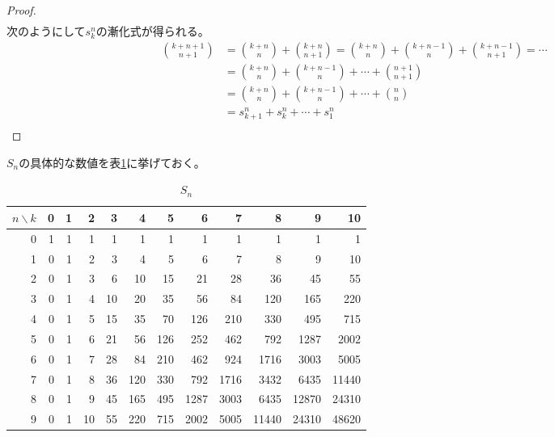 {\begin{proof}
\begin{equation*}
\begin{split}
		\end{split}\end{equation*}
		次のようにして$s^n_k$の漸化式が得られる。
		\begin{equation*}\begin{split}
			\binom{k+n+1}{n+1} &= \binom{k+n}{n} + \binom{k+n}{n+1}
			= \binom{k+n}{n} + \binom{k+n-1}{n} + \binom{k+n-1}{n+1} = \cdots \\
			&= \binom{k+n}{n} + \binom{k+n-1}{n} +\cdots+ \binom{n+1}{n+1} \\
			&= \binom{k+n}{n} + \binom{k+n-1}{n} +\cdots+ \binom{n}{n} \\
			&= s^n_{k+1} + s^n_k +\cdots+ s^n_1 \\
		\end{split}\end{equation*}
	\end{proof} %
	$S_n$の具体的な数値を表\ref{table:低次のS}に挙げておく。

\begin{table}[ht]
\begin{center}
\begin{tabular}{r|rrrrrrrrrrr}
  \hline
$n\backslash k$ & 0 & 1 & 2 & 3 & 4 & 5 & 6 & 7 & 8 & 9 & 10 \\ 
  \hline
	0 & 1 &  1 &   1 &   1 &   1 &   1 &   1 &   1 &   1 &   1 &   1 \\ 
  1 & 0 &  1 &   2 &   3 &   4 &   5 &   6 &   7 &   8 &   9 &  10 \\ 
  2 & 0 &  1 &   3 &   6 &  10 &  15 &  21 &  28 &  36 &  45 &  55 \\ 
  3 & 0 &  1 &   4 &  10 &  20 &  35 &  56 &  84 & 120 & 165 & 220 \\ 
  4 & 0 &  1 &   5 &  15 &  35 &  70 & 126 & 210 & 330 & 495 & 715 \\ 
  5 & 0 &  1 &   6 &  21 &  56 & 126 & 252 & 462 & 792 & 1287 & 2002 \\ 
  6 & 0 &  1 &   7 &  28 &  84 & 210 & 462 & 924 & 1716 & 3003 & 5005 \\ 
  7 & 0 &  1 &   8 &  36 & 120 & 330 & 792 & 1716 & 3432 & 6435 & 11440 \\ 
  8 & 0 &  1 &   9 &  45 & 165 & 495 & 1287 & 3003 & 6435 & 12870 & 24310 \\ 
  9 & 0 &  1 &  10 &  55 & 220 & 715 & 2002 & 5005 & 11440 & 24310 & 48620 \\ 
   \hline
\end{tabular}
\end{center}\caption{$S_n$}\label{table:低次のS}
\end{table}

}
